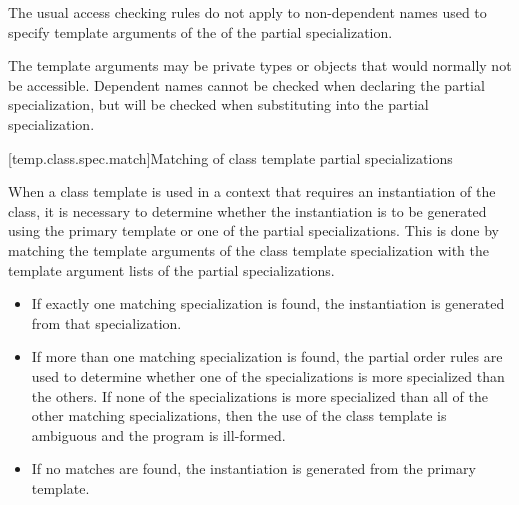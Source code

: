 \pnum
The usual access checking rules do not apply to non-dependent names
used to specify template arguments of the 
of the partial specialization.
\begin{note}
The template arguments may be private types or
objects that would normally not be accessible.
Dependent names cannot be checked when declaring the partial specialization,
but will be checked when substituting into the partial specialization.
\end{note}

[temp.class.spec.match]{Matching of class template partial specializations}

\pnum
When a class template is used in a context that requires an instantiation of
the class,
it is necessary to determine whether the instantiation is to be generated
using the primary template or one of the partial specializations.
This is done by matching the template arguments of the class template
specialization with the template argument lists of the partial
specializations.

\begin{itemize}
\item
If exactly one matching specialization is found, the instantiation is
generated from that specialization.
\item
If more than one matching specialization is found,
the partial order rules are used to determine
whether one of the specializations is more specialized than the
others.
If none of the specializations is more specialized than all of the
other matching specializations, then the use of the class template
is ambiguous and the program is ill-formed.
\item
If no matches are found, the instantiation is generated from the
primary template.
\end{itemize}

